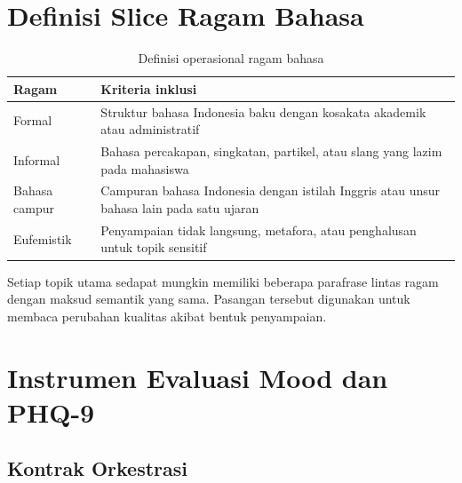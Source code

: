 \section{Definisi Slice Ragam Bahasa}
\label{lamp:v2-language-slices}

\begin{table}[!htbp]
\centering
\caption{Definisi operasional ragam bahasa}
{\footnotesize
\begin{tabularx}{\textwidth}{|>{\raggedright\arraybackslash}p{2.7cm}|>{\raggedright\arraybackslash}X|}
\hline
\rowcolor{tableheadgray}
\textbf{Ragam} & \textbf{Kriteria inklusi} \\
\hline
Formal & Struktur bahasa Indonesia baku dengan kosakata akademik atau administratif \\
\hline
Informal & Bahasa percakapan, singkatan, partikel, atau slang yang lazim pada mahasiswa \\
\hline
Bahasa campur & Campuran bahasa Indonesia dengan istilah Inggris atau unsur bahasa lain pada satu ujaran \\
\hline
Eufemistik & Penyampaian tidak langsung, metafora, atau penghalusan untuk topik sensitif \\
\hline
\end{tabularx}
}
\end{table}

Setiap topik utama sedapat mungkin memiliki beberapa parafrase lintas ragam dengan maksud semantik yang sama. Pasangan tersebut digunakan untuk membaca perubahan kualitas akibat bentuk penyampaian.

\section{Instrumen Evaluasi Mood dan PHQ-9}
\label{lamp:v2-phq-corpus}

\subsection{Kontrak Orkestrasi}

